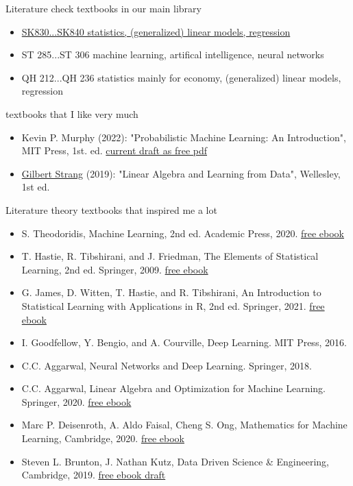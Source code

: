 \documentclass[mathserif, aspectratio=1610]{intbeamer}
\begin{document}
\begin{frame}{Literature}
  check textbooks in our main library
  \begin{itemize}
    \item \href{https://find.ub.uni-rostock.de/sk830}{SK830...SK840 statistics, (generalized) linear models, regression}
    \item ST 285...ST 306 machine learning, artifical intelligence, neural networks
    \item QH 212...QH 236 statistics mainly for economy, (generalized) linear models, regression
  \end{itemize}
  textbooks that I like very much
  \begin{itemize}
    \item Kevin P. Murphy (2022): "Probabilistic Machine Learning: An Introduction", MIT Press, 1st. ed.
    \href{https://probml.github.io/pml-book/book1.html}{current draft as free pdf}
    \item \href{https://math.mit.edu/~gs/}{Gilbert Strang} (2019): "Linear Algebra and Learning from Data", Wellesley, 1st ed.
  \end{itemize}
\end{frame}

\begin{frame}{Literature}
  theory textbooks that inspired me a lot
  \begin{itemize}
    \item S. Theodoridis, Machine Learning, 2nd ed. Academic Press, 2020.
    \href{https://www.sciencedirect.com/book/9780128188033/machine-learning}{free ebook}
    \item T. Hastie, R. Tibshirani, and J. Friedman, The Elements of Statistical Learning, 2nd ed. Springer, 2009.
    \href{https://hastie.su.domains/ElemStatLearn/}{free ebook}
    \item G. James, D. Witten, T. Hastie, and R. Tibshirani, An Introduction to Statistical Learning with Applications in R, 2nd ed. Springer, 2021. \href{https://www.statlearning.com/}{free ebook}
    \item I. Goodfellow, Y. Bengio, and A. Courville, Deep Learning. MIT Press, 2016.
    \item C.C. Aggarwal, Neural Networks and Deep Learning. Springer, 2018.
    \item C.C. Aggarwal, Linear Algebra and Optimization for Machine Learning. Springer, 2020. \href{https://link.springer.com/book/10.1007/978-3-030-40344-7}{free ebook}
    \item Marc P. Deisenroth, A. Aldo Faisal, Cheng S. Ong, Mathematics for Machine Learning, Cambridge, 2020. \href{https://mml-book.github.io/book/mml-book.pdf}{free ebook}
    \item Steven L. Brunton, J. Nathan Kutz, Data Driven Science \& Engineering, Cambridge, 2019. \href{http://www.databookuw.com/databook.pdf}{free ebook draft}
  \end{itemize}
\end{frame}
\end{document}
